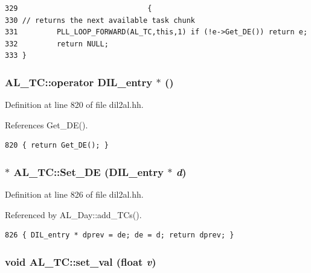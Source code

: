 \footnotesize\begin{verbatim}329                              {
330 // returns the next available task chunk
331         PLL_LOOP_FORWARD(AL_TC,this,1) if (!e->Get_DE()) return e;
332         return NULL;
333 }
\end{verbatim}\normalsize 
{}
\subsubsection{\setlength{\rightskip}{0pt plus 5cm}AL\_\-TC::operator {\bf DIL\_\-entry} $\ast$ ()\hspace{0.3cm}{\tt  [inline]}}\label{classAL__TC_a7}




Definition at line 820 of file dil2al.hh.

References Get\_\-DE().



\footnotesize\begin{verbatim}820 { return Get_DE(); }
\end{verbatim}\normalsize 
{}
\subsubsection{$\ast$ AL\_\-TC::Set\_\-DE ({\bf DIL\_\-entry} $\ast$ {\em d})\hspace{0.3cm}{\tt  [inline]}}\label{classAL__TC_a10}




Definition at line 826 of file dil2al.hh.

Referenced by AL\_\-Day::add\_\-TCs().



\footnotesize\begin{verbatim}826 { DIL_entry * dprev = de; de = d; return dprev; }
\end{verbatim}\normalsize 
{}
\subsubsection{\setlength{\rightskip}{0pt plus 5cm}void AL\_\-TC::set\_\-val (float {\em v})\hspace{0.3cm}{\tt  [inline]}}\label{classAL__TC_a5}





